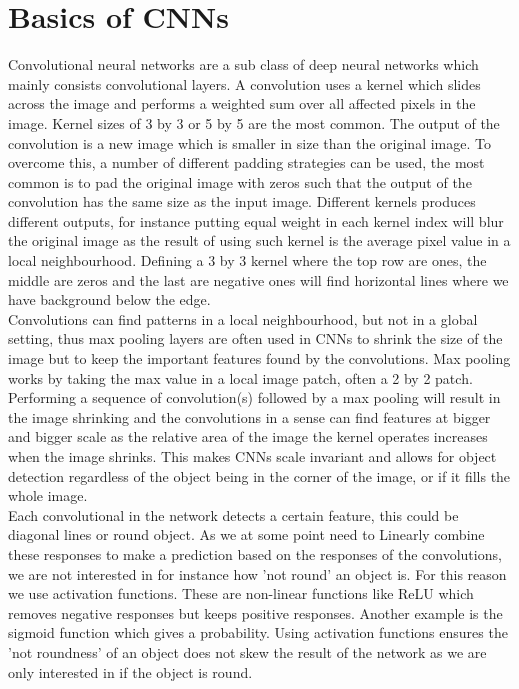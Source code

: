 \section{Basics of CNNs}
Convolutional neural networks are a sub class of deep neural networks which mainly consists convolutional layers. A convolution uses a kernel which slides across the image and performs a weighted sum over all affected pixels in the image. Kernel sizes of 3 by 3 or 5 by 5 are the most common. The output of the convolution is a new image which is smaller in size than the original image. To overcome this, a number of different padding strategies can be used, the most common is to pad the original image with zeros such that the output of the convolution has the same size as the input image. Different kernels produces different outputs, for instance putting equal weight in each kernel index will blur the original image as the result of using such kernel is the average pixel value in a local neighbourhood. Defining a 3 by 3 kernel where the top row are ones, the middle are zeros and the last are negative ones will find horizontal lines where we have background below the edge.\\
Convolutions can find patterns in a local neighbourhood, but not in a global setting, thus max pooling layers are often used in CNNs to shrink the size of the image but to keep the important features found by the convolutions. Max pooling works by taking the max value in a local image patch, often a 2 by 2 patch. Performing a sequence of convolution(s) followed by a max pooling will result in the image shrinking and the convolutions in a sense can find features at bigger and bigger scale as the relative area of the image the kernel operates increases when the image shrinks. This makes CNNs scale invariant and allows for object detection regardless of the object being in the corner of the image, or if it fills the whole image.\\
Each convolutional in the network detects a certain feature, this could be diagonal lines or round object. As we at some point need to Linearly combine these responses to make a prediction based on the responses of the convolutions, we are not interested in for instance how 'not round' an object is. For this reason we use activation functions. These are non-linear functions like ReLU which removes negative responses but keeps positive responses. Another example is the sigmoid function which gives a probability. Using activation functions ensures the 'not roundness' of an object does not skew the result of the network as we are only interested in if the object is round. 